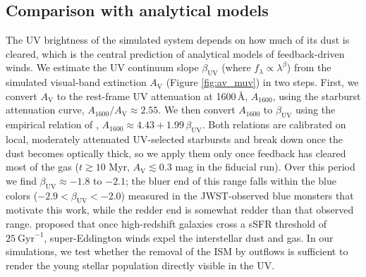 \documentclass[twocolumn,linenumbers]{aastex631}
\begin{document}
\subsection{Comparison with analytical models}
The UV brightness of the simulated system depends on how much of its dust is cleared, which is the central prediction of analytical models of feedback-driven winds. We estimate the UV continuum slope $\beta_\mathrm{UV}$ (where $f_\lambda \propto \lambda^\beta$) from the simulated visual-band extinction $A_\mathrm{V}$ (Figure \ref{fig:av_muv}) in two steps. First, we convert $A_\mathrm{V}$ to the rest-frame UV attenuation at 1600\,\AA, $A_{1600}$, using the \citet{2000ApJ...533..682C} starburst attenuation curve, $A_{1600}/A_\mathrm{V} \approx 2.55$. We then convert $A_{1600}$ to $\beta_\mathrm{UV}$ using the empirical relation of \citet{1999ApJ...521...64M}, $A_{1600} \approx 4.43 + 1.99\,\beta_\mathrm{UV}$. Both relations are calibrated on local, moderately attenuated UV-selected starbursts and break down once the dust becomes optically thick, so we apply them only once feedback has cleared most of the gas ($t\gtrsim10$ Myr, $A_\mathrm{V}\lesssim0.3$ mag in the fiducial run). Over this period we find $\beta_\mathrm{UV}\approx -1.8$ to $-2.1$; the bluer end of this range falls within the blue colors ($-2.9<\beta_\mathrm{UV}<-2.0$) measured in the JWST-observed blue monsters that motivate this work, while the redder end is somewhat redder than that observed range.
\cite{2023MNRAS.522.3986F} proposed that once high-redshift galaxies cross a sSFR threshold of $25\ \mathrm{Gyr}^{-1}$, super-Eddington winds expel the interstellar dust and gas. In our simulations, we test whether the removal of the ISM by outflows is sufficient to render the young stellar population directly visible in the UV. 
\end{document}
